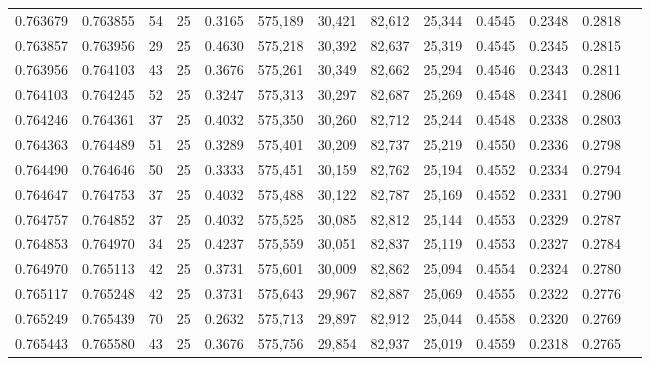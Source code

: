 \begin{tabular}{rrrrrrrrrrrrr}
0.763679 & 0.763855 &    54 &  25 &                                     0.3165 & 575,189 &  30,421 &  82,612 &  25,344 & 0.4545 & 0.2348 & 0.2818 \\
0.763857 & 0.763956 &    29 &  25 &                                     0.4630 & 575,218 &  30,392 &  82,637 &  25,319 & 0.4545 & 0.2345 & 0.2815 \\
0.763956 & 0.764103 &    43 &  25 &                                     0.3676 & 575,261 &  30,349 &  82,662 &  25,294 & 0.4546 & 0.2343 & 0.2811 \\
0.764103 & 0.764245 &    52 &  25 &                                     0.3247 & 575,313 &  30,297 &  82,687 &  25,269 & 0.4548 & 0.2341 & 0.2806 \\
0.764246 & 0.764361 &    37 &  25 &                                     0.4032 & 575,350 &  30,260 &  82,712 &  25,244 & 0.4548 & 0.2338 & 0.2803 \\
0.764363 & 0.764489 &    51 &  25 &                                     0.3289 & 575,401 &  30,209 &  82,737 &  25,219 & 0.4550 & 0.2336 & 0.2798 \\
0.764490 & 0.764646 &    50 &  25 &                                     0.3333 & 575,451 &  30,159 &  82,762 &  25,194 & 0.4552 & 0.2334 & 0.2794 \\
0.764647 & 0.764753 &    37 &  25 &                                     0.4032 & 575,488 &  30,122 &  82,787 &  25,169 & 0.4552 & 0.2331 & 0.2790 \\
0.764757 & 0.764852 &    37 &  25 &                                     0.4032 & 575,525 &  30,085 &  82,812 &  25,144 & 0.4553 & 0.2329 & 0.2787 \\
0.764853 & 0.764970 &    34 &  25 &                                     0.4237 & 575,559 &  30,051 &  82,837 &  25,119 & 0.4553 & 0.2327 & 0.2784 \\
0.764970 & 0.765113 &    42 &  25 &                                     0.3731 & 575,601 &  30,009 &  82,862 &  25,094 & 0.4554 & 0.2324 & 0.2780 \\
0.765117 & 0.765248 &    42 &  25 &                                     0.3731 & 575,643 &  29,967 &  82,887 &  25,069 & 0.4555 & 0.2322 & 0.2776 \\
0.765249 & 0.765439 &    70 &  25 &                                     0.2632 & 575,713 &  29,897 &  82,912 &  25,044 & 0.4558 & 0.2320 & 0.2769 \\
0.765443 & 0.765580 &    43 &  25 &                                     0.3676 & 575,756 &  29,854 &  82,937 &  25,019 & 0.4559 & 0.2318 & 0.2765 \\

\end{tabular}
